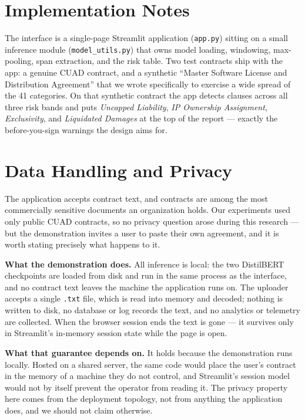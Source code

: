 \section{Implementation Notes}
The interface is a single-page Streamlit application (\texttt{app.py}) sitting on a small inference module (\texttt{model\_utils.py}) that owns model loading, windowing, max-pooling, span extraction, and the risk table. Two test contracts ship with the app: a genuine CUAD contract, and a synthetic ``Master Software License and Distribution Agreement'' that we wrote specifically to exercise a wide spread of the 41 categories. On that synthetic contract the app detects clauses across all three risk bands and puts \emph{Uncapped Liability}, \emph{IP Ownership Assignment}, \emph{Exclusivity}, and \emph{Liquidated Damages} at the top of the report --- exactly the before-you-sign warnings the design aims for.

\section{Data Handling and Privacy}
\label{sec:privacy}
The application accepts contract text, and contracts are among the most commercially sensitive documents an organization holds. Our experiments used only public CUAD contracts, so no privacy question arose during this research --- but the demonstration invites a user to paste their own agreement, and it is worth stating precisely what happens to it.

\textbf{What the demonstration does.} All inference is local: the two DistilBERT checkpoints are loaded from disk and run in the same process as the interface, and no contract text leaves the machine the application runs on. The uploader accepts a single \texttt{.txt} file, which is read into memory and decoded; nothing is written to disk, no database or log records the text, and no analytics or telemetry are collected. When the browser session ends the text is gone --- it survives only in Streamlit's in-memory session state while the page is open.

\textbf{What that guarantee depends on.} It holds because the demonstration runs locally. Hosted on a shared server, the same code would place the user's contract in the memory of a machine they do not control, and Streamlit's session model would not by itself prevent the operator from reading it. The privacy property here comes from the deployment topology, not from anything the application does, and we should not claim otherwise.

